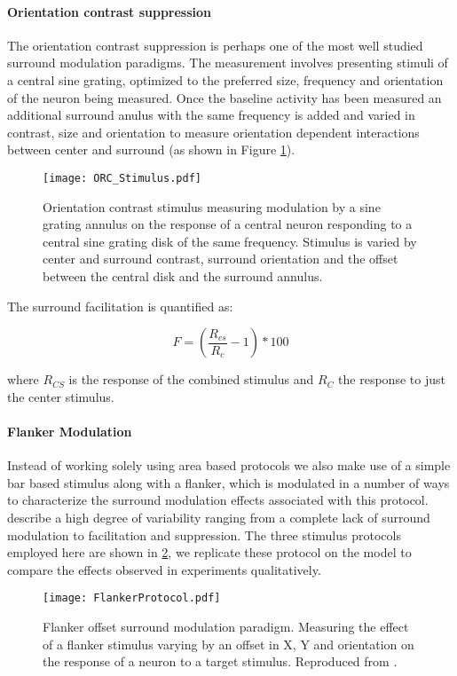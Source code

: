 \paragraph{Orientation contrast suppression}

The orientation contrast suppression is perhaps one of the most well
studied surround modulation paradigms. The measurement involves
presenting stimuli of a central sine grating, optimized to the
preferred size, frequency and orientation of the neuron being
measured. Once the baseline activity has been measured an additional
surround anulus with the same frequency is added and varied in
contrast, size and orientation to measure orientation dependent
interactions between center and surround (as shown in Figure
\ref{ORC_Stimulus}).

\begin{figure}
	\centering
        \texttt{[image: ORC\_Stimulus.pdf]}
	\caption{Orientation contrast stimulus measuring modulation by a
      sine grating annulus on the response of a central neuron
      responding to a central sine grating disk of the same frequency.
      Stimulus is varied by center and surround contrast, surround
      orientation and the offset between the central disk and the
      surround annulus.}
	\label{ORC_Stimulus}
\end{figure}

The surround facilitation is quantified as:

\begin{equation}
F = (\frac{R_{cs}}{R_c} - 1) * 100
\end{equation}

where $R_{CS}$ is the response of the combined stimulus and $R_C$ the
response to just the center stimulus.

\paragraph{Flanker Modulation}

Instead of working solely using area based protocols we also make use
of a simple bar based stimulus along with a flanker, which is
modulated in a number of ways to characterize the surround modulation
effects associated with this protocol. \cite{Kapadia1995} describe
a high degree of variability ranging from a complete lack of surround
modulation to facilitation and suppression. The three stimulus
protocols employed here are shown in \ref{Flanker}, we replicate these
protocol on the model to compare the effects observed in experiments
qualitatively.

\begin{figure}
	\centering
        \texttt{[image: FlankerProtocol.pdf]}
	\caption[Flanker offset stimuli. Reproduced from
      \cite{Kapadia1995}.]{Flanker offset surround modulation
      paradigm. Measuring the effect of a flanker stimulus varying by
      an offset in X, Y and orientation on the response of a neuron to
      a target stimulus. Reproduced from \cite{Kapadia1995}.}
	\label{Flanker}
\end{figure}
